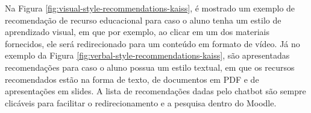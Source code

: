 Na Figura \ref{fig:visual-style-recommendations-kaiss}, é mostrado um exemplo de recomendação de recurso educacional para caso o aluno tenha um estilo de aprendizado visual, em que por exemplo, ao clicar em um dos materiais fornecidos, ele será redirecionado para um conteúdo em formato de vídeo. Já no exemplo da Figura \ref{fig:verbal-style-recommendations-kaiss}, são apresentadas recomendações para caso o aluno possua um estilo textual, em que os recursos recomendados estão na forma de texto, de documentos em PDF e de apresentações em slides. A lista de recomendações dadas pelo chatbot são sempre clicáveis para facilitar o redirecionamento e a pesquisa dentro do Moodle.

\begin{figure}[ht] 
   	\captionsetup{width=16cm}
\end{figure}

\begin{figure}[ht] 
   	\captionsetup{width=16cm}
\end{figure}

